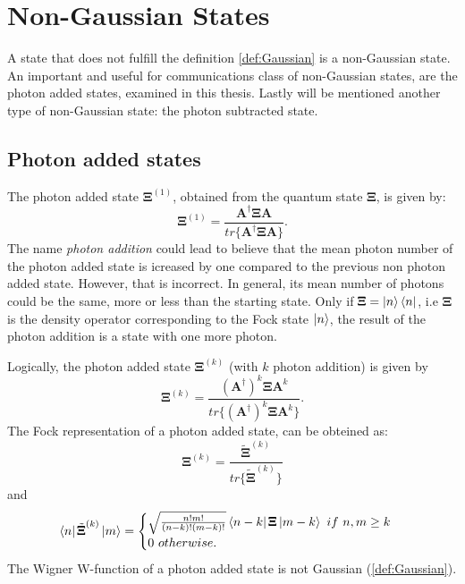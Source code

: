\section{Non-Gaussian States}
    A state that does not fulfill the definition \ref{def:Gaussian} is a non-Gaussian state.
    An important and useful for communications class of non-Gaussian states, are the photon 
    added states, examined in this thesis. Lastly will be mentioned another type of non-Gaussian
    state: the photon subtracted state.
    
    \subsection{Photon added states}
        \label{PAS}
        The photon added state $\pmb{\Xi}^{(1)}$, obtained from the quantum state $\pmb{\Xi}$,
        is given by:
        \begin{equation}
            \pmb{\Xi}^{(1)}=\frac{\pmb{A}^\dagger\pmb{\Xi}\pmb{A}}
            {tr\{\pmb{A}^\dagger\pmb{\Xi}\pmb{A}\}}.
        \end{equation}
        The name \emph{photon addition} could lead to believe that the mean photon number of the 
        photon added state is icreased by one compared to the previous non photon added state.
        However, that is incorrect.
        In general, its mean number of photons could be the same, more or less than the starting state.
        Only if $\pmb{\Xi}=\ket{n}\bra{n}$, i.e $\pmb{\Xi}$ is the density operator corresponding to
        the Fock state $\ket{n}$, the result of the photon addition is a state with one more photon.

        Logically, the photon added state $\pmb{\Xi}^{(k)}$ (with $k$ photon addition) is given by
        \begin{equation}
            \pmb{\Xi}^{(k)}=\frac{(\pmb{A}^\dagger)^k\pmb{\Xi}\pmb{A}^k}
            {tr\{(\pmb{A}^\dagger)^k\pmb{\Xi}\pmb{A}^k\}}.
        \end{equation}
        The Fock representation of a photon added state, can be obteined as:
        \begin{equation}
            \pmb{\Xi}^{(k)}=\frac{\tilde{\pmb{\Xi}}^{(k)}}{tr\{\tilde{\pmb{\Xi}}^{(k)}\}}
        \end{equation}
        and
        \begin{equation*}
            \bra{n}\tilde{\pmb{\Xi}}^{(k)}\ket{m}=
            \begin{cases}
                \sqrt{\frac{n!m!}{(n-k)!(m-k)!}}\bra{n-k}\pmb{\Xi}\ket{m-k}\ if\ n,m \geq k\\
                0\ otherwise.
            \end{cases}
        \end{equation*}
        The Wigner W-function of a photon added state is not Gaussian (\ref{def:Gaussian}).

